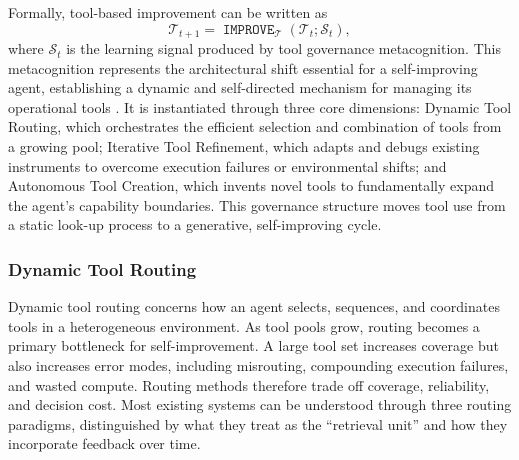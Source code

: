 \documentclass{article}
\newcommand{\IMPROVE}{\operatorname{\mathtt{IMPROVE}}}
\begin{document}
Formally, tool-based improvement can be written as
\begin{equation}
\mathcal{T}_{t+1}=\IMPROVE_{\mathcal{T}}(\mathcal{T}_t;\mathcal{S}_t),
\end{equation}
where $\mathcal{S}_t$ is the learning signal produced by tool governance metacognition. This metacognition represents the architectural shift essential for a self-improving agent, establishing a dynamic and self-directed mechanism for managing its operational tools \citep{wang2025theoryagentstoolusedecisionmakers}. It is instantiated through three core dimensions: Dynamic Tool Routing, which orchestrates the efficient selection and combination of tools from a growing pool; Iterative Tool Refinement, which adapts and debugs existing instruments to overcome execution failures or environmental shifts; and Autonomous Tool Creation, which invents novel tools to fundamentally expand the agent's capability boundaries. This governance structure moves tool use from a static look-up process to a generative, self-improving cycle.


\subsubsection{Dynamic Tool Routing}
\label{sec:Dynamic_Tool_Routing}

Dynamic tool routing concerns how an agent selects, sequences, and coordinates tools in a heterogeneous environment. As tool pools grow, routing becomes a primary bottleneck for self-improvement. A large tool set increases coverage but also increases error modes, including misrouting, compounding execution failures, and wasted compute. Routing methods therefore trade off coverage, reliability, and decision cost. Most existing systems can be understood through three routing paradigms, distinguished by what they treat as the ``retrieval unit'' and how they incorporate feedback over time.
\end{document}
